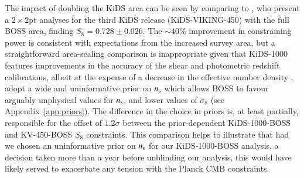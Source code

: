 The impact of doubling the KiDS area can be seen by comparing to \citet{troester/etal:2020}, who present a $2\times2$pt analyses for the third KiDS release (KiDS-VIKING-450) with the full BOSS area, finding $S_8 = 0.728 \pm 0.026$.   The $\sim 40\%$ improvement in constraining power is consistent with expectations from the increased survey area, but a straightforward area-scaling comparison is inappropriate given that KiDS-1000 features improvements in the accuracy of the shear and photometric redshift calibrations, albeit at the expense of a decrease in the effective number density \citep[see][for details]{giblin/etal:inprep}.  \citet{troester/etal:2020} adopt a wide and uninformative prior on $n_{\rm s}$ which allows BOSS to favour arguably unphysical values for $n_{\rm s}$, and lower values of $\sigma_8$ (see Appendix~\ref{app:priors}).   The difference in the choice in priors is, at least partially, responsible for the offset of $1.2\sigma$ between the prior-dependent KiDS-1000-BOSS and KV-450-BOSS $S_8$ constraints.   This comparison helps to illustrate that had we chosen an uninformative prior on $n_{\rm s}$ for our KiDS-1000-BOSS analysis, a decision taken more than a year before unblinding our analysis, this would have likely served to exacerbate any tension with the Planck CMB constraints. 















